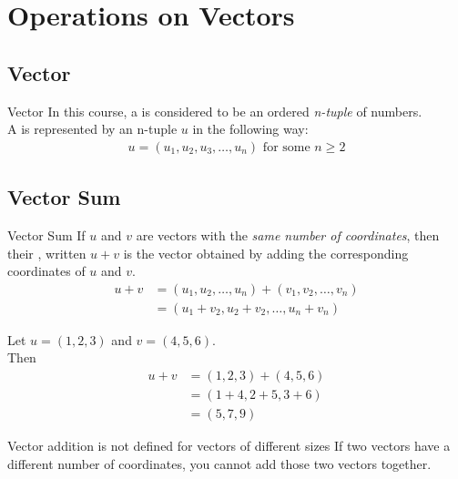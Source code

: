 \documentclass[\main/notes.tex]{subfiles}
\begin{document}
		\section{Operations on Vectors}
			\subsection{Vector}
				\begin{definition}{Vector}
					In this course, a  is considered to be an ordered \emph{n-tuple} of numbers.\\
					A  is represented by an n-tuple $u$ in the following way:
					\begin{align*}
						u = (u_{1}, u_{2}, u_{3}, \ldots, u_{n}) \text{ for some } n \geq 2
					\end{align*}
				\end{definition}
			\subsection{Vector Sum}
				\begin{definition}{Vector Sum}
					If $u$ and $v$ are vectors with the \emph{same number of coordinates}, then their , written $u + v$ is the vector obtained by adding the corresponding coordinates of $u$ and $v$.
					\begin{align*}
						u + v &= (u_{1}, u_{2}, \ldots, u_{n}) + (v_{1}, v_{2}, \ldots, v_{n})\\
						&= (u_{1} + v_{2}, u_{2} + v_{2}, \ldots, u_{n} + v_{n})
					\end{align*}
				\end{definition}
				\begin{example}[width=0.5\textwidth]
					Let $u = (1, 2, 3)$ and $v = (4, 5, 6)$.\\
					Then 
					\begin{align*}
						u + v &= (1, 2, 3) + (4, 5, 6)\\
						&= (1 + 4, 2 + 5, 3 + 6)\\
						&= (5, 7, 9)
					\end{align*} 
				\end{example}
				\begin{sidenote}{Vector addition is not defined for vectors of different sizes}
					If two vectors have a different number of coordinates, you cannot add those two vectors together.
				\end{sidenote}
			\pagebreak
\end{document}
